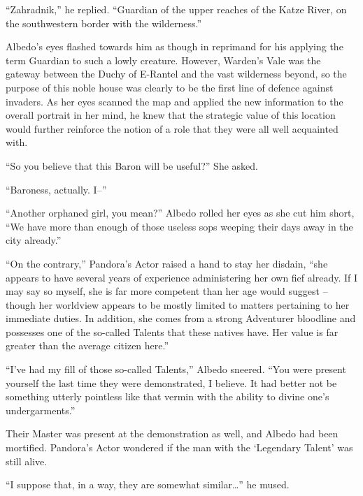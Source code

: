“Zahradnik,” he replied. “Guardian of the upper reaches of the Katze River, on the southwestern border with the wilderness.”

 

Albedo’s eyes flashed towards him as though in reprimand for his applying the term Guardian to such a lowly creature. However, Warden’s Vale was the gateway between the Duchy of E-Rantel and the vast wilderness beyond, so the purpose of this noble house was clearly to be the first line of defence against invaders. As her eyes scanned the map and applied the new information to the overall portrait in her mind, he knew that the strategic value of this location would further reinforce the notion of a role that they were all well acquainted with.

 

“So you believe that this Baron will be useful?” She asked.

 

“Baroness, actually. I–”

 

“Another orphaned girl, you mean?” Albedo rolled her eyes as she cut him short, “We have more than enough of those useless sops weeping their days away in the city already.”

 

“On the contrary,” Pandora’s Actor raised a hand to stay her disdain, “she appears to have several years of experience administering her own fief already. If I may say so myself, she is far more competent than her age would suggest – though her worldview appears to be mostly limited to matters pertaining to her immediate duties. In addition, she comes from a strong Adventurer bloodline and possesses one of the so-called Talents that these natives have. Her value is far greater than the average citizen here.”

 

“I’ve had my fill of those so-called Talents,” Albedo sneered. “You were present yourself the last time they were demonstrated, I believe. It had better not be something utterly pointless like that vermin with the ability to divine one’s undergarments.”

 

Their Master was present at the demonstration as well, and Albedo had been mortified. Pandora’s Actor wondered if the man with the ‘Legendary Talent’ was still alive.

 

“I suppose that, in a way, they are somewhat similar…” he mused.

